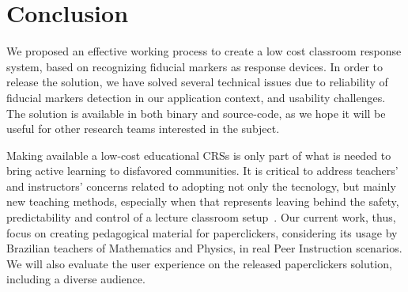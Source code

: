 \section{Conclusion} \label{sec:conclusion}

We proposed an effective working process to create a low cost classroom response system, based on recognizing fiducial markers as response devices. In order to release the solution, we have solved several technical issues due to reliability of fiducial markers detection in our application context, and usability challenges. The solution is available in both binary and source-code, as we hope it will be useful for other research teams interested in the subject.

Making available a low-cost educational CRSs is only part of what is needed to bring active learning to disfavored communities. It is critical to address teachers' and instructors' concerns related to adopting not only the tecnology, but mainly new teaching methods, especially when that represents leaving behind the safety, predictability and control of a lecture classroom setup~\cite{beatty2005transforming}. Our current work, thus, focus on creating pedagogical material for paperclickers, considering its usage by Brazilian teachers of Mathematics and Physics, in real Peer Instruction scenarios. We will also evaluate the user experience on the released paperclickers solution, including a diverse audience.



